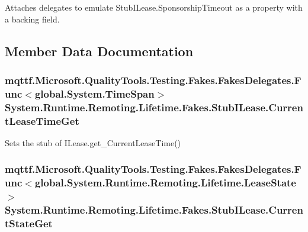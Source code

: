 Attaches delegates to emulate Stub\-I\-Lease.\-Sponsorship\-Timeout as a property with a backing field.



\subsection{Member Data Documentation}
\hypertarget{class_system_1_1_runtime_1_1_remoting_1_1_lifetime_1_1_fakes_1_1_stub_i_lease_a15ef5fda70a106d9702cbd1086cb11bf}{
\subsubsection[{Current\-Lease\-Time\-Get}]{\setlength{\rightskip}{0pt plus 5cm}mqttf.\-Microsoft.\-Quality\-Tools.\-Testing.\-Fakes.\-Fakes\-Delegates.\-Func$<$global.\-System.\-Time\-Span$>$ System.\-Runtime.\-Remoting.\-Lifetime.\-Fakes.\-Stub\-I\-Lease.\-Current\-Lease\-Time\-Get}}\label{class_system_1_1_runtime_1_1_remoting_1_1_lifetime_1_1_fakes_1_1_stub_i_lease_a15ef5fda70a106d9702cbd1086cb11bf}


Sets the stub of I\-Lease.\-get\-\_\-\-Current\-Lease\-Time()

\hypertarget{class_system_1_1_runtime_1_1_remoting_1_1_lifetime_1_1_fakes_1_1_stub_i_lease_ad390be9748313de587622dba1e40ba00}{
\subsubsection[{Current\-State\-Get}]{\setlength{\rightskip}{0pt plus 5cm}mqttf.\-Microsoft.\-Quality\-Tools.\-Testing.\-Fakes.\-Fakes\-Delegates.\-Func$<$global.\-System.\-Runtime.\-Remoting.\-Lifetime.\-Lease\-State$>$ System.\-Runtime.\-Remoting.\-Lifetime.\-Fakes.\-Stub\-I\-Lease.\-Current\-State\-Get}}\label{class_system_1_1_runtime_1_1_remoting_1_1_lifetime_1_1_fakes_1_1_stub_i_lease_ad390be9748313de587622dba1e40ba00}


